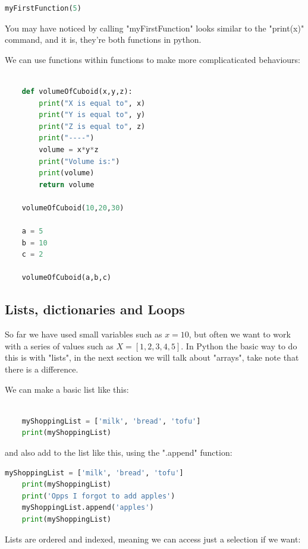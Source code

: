 \documentclass[12pt]{article}
\begin{document}
\begin{lstlisting}[language=Python]
myFirstFunction(5)
\end{lstlisting}

You may have noticed by calling "myFirstFunction" looks similar to the "print(x)" command, and it is, they're both functions in python. 

We can use functions within functions to make more complicaticated behaviours: 

\begin{lstlisting}[language=Python]

    def volumeOfCuboid(x,y,z):
        print("X is equal to", x)
        print("Y is equal to", y)
        print("Z is equal to", z)
        print("----")
        volume = x*y*z
        print("Volume is:")
        print(volume)
        return volume

    volumeOfCuboid(10,20,30)
    
    a = 5
    b = 10
    c = 2

    volumeOfCuboid(a,b,c)
\end{lstlisting}
    
\subsection{Lists, dictionaries and Loops}

So far we have used small variables such as $x=10$, but often we want to work with a series of values such as $X = [1,2,3,4,5]$. In Python the basic way to do this is with "lists", in the next section we will talk about "arrays", take note that there is a difference. 

We can make a basic list like this:

\begin{lstlisting}[language=Python]

    myShoppingList = ['milk', 'bread', 'tofu']
    print(myShoppingList)
\end{lstlisting}

and also add to the list like this, using the ".append" function:

\begin{lstlisting}[language=Python]
    myShoppingList = ['milk', 'bread', 'tofu']
    print(myShoppingList)
    print('Opps I forgot to add apples')
    myShoppingList.append('apples')
    print(myShoppingList)
\end{lstlisting}

Lists are ordered and indexed, meaning we can access just a selection if we want:
\end{document}
